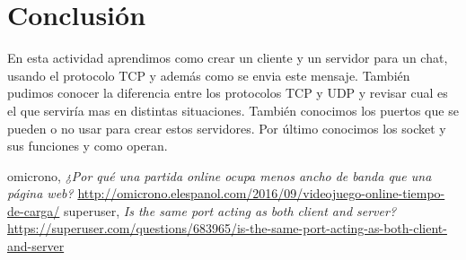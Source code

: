 \documentclass[onecolumn,11pts]{IEEEtran}
\begin{document}
\newpage
\section{Conclusión}
En esta actividad aprendimos como crear un cliente y un servidor para un chat, usando el protocolo TCP y además como se envia este mensaje. También pudimos conocer la diferencia entre los protocolos TCP y UDP y revisar cual es el que serviría mas en distintas situaciones. También conocimos los puertos que se pueden o no usar para crear estos servidores. Por último conocimos los socket y sus funciones y como operan.


\clearpage

\begin{thebibliography}{15}

  omicrono,
  \emph{¿Por qué una partida online ocupa menos ancho de banda que una página web? }
  \url{http://omicrono.elespanol.com/2016/09/videojuego-online-tiempo-de-carga/}
  superuser,
  \emph{Is the same port acting as both client and server?}
  \url{https://superuser.com/questions/683965/is-the-same-port-acting-as-both-client-and-server}

\end{thebibliography}
\end{document}
